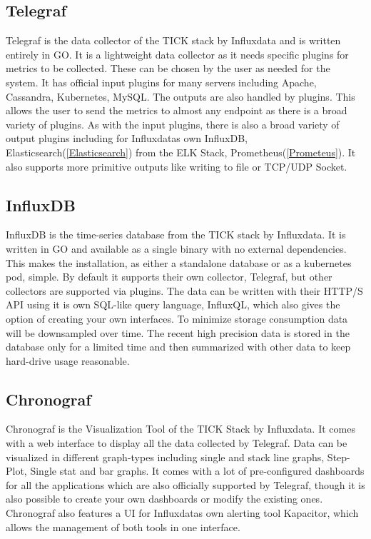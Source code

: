 \subsection{Telegraf}
Telegraf is the data collector of the TICK stack by Influxdata and is written entirely in GO. It is a lightweight data collector as it needs specific plugins for metrics to be collected. These can be chosen by the user as needed for the system. It has official input plugins for many servers including Apache, Cassandra, Kubernetes, MySQL.
The outputs are also handled by plugins. This allows the user to send the metrics to almost any endpoint as there is a broad variety of plugins. As with the input plugins, there is also a broad variety of output plugins including for Influxdatas own InfluxDB, Elasticsearch(\ref{Elasticsearch}) from the ELK Stack, Prometheus(\ref{Prometeus}). It also supports more primitive outputs like writing to file or TCP/UDP Socket.
\subsection{InfluxDB}
InfluxDB is the time-series database from the TICK stack by Influxdata. It is written in GO and available as a single binary with no external dependencies. This makes the installation, as either a standalone database or as a kubernetes pod, simple.
By default it supports their own collector, Telegraf, but other collectors are supported via plugins. The data can be written with their  HTTP/S API using it is own SQL-like query language, InfluxQL, which also gives the option of creating your own interfaces.
To minimize storage consumption data will be downsampled over time. The recent high precision data is stored in the database only for a limited time and then summarized with other data to keep hard-drive usage reasonable. 
\subsection{Chronograf}
Chronograf is the Visualization Tool of the TICK Stack by Influxdata. It comes with a web interface to display all the data collected by Telegraf. Data can be visualized in different graph-types including single and stack line graphs, Step-Plot, Single stat and bar graphs. It comes with a lot of pre-configured dashboards for all the applications which are also officially supported by Telegraf, though it is also possible to create your own dashboards or modify the existing ones. 
Chronograf also features a UI for Influxdatas own alerting tool Kapacitor, which allows the management of both tools in one interface.
